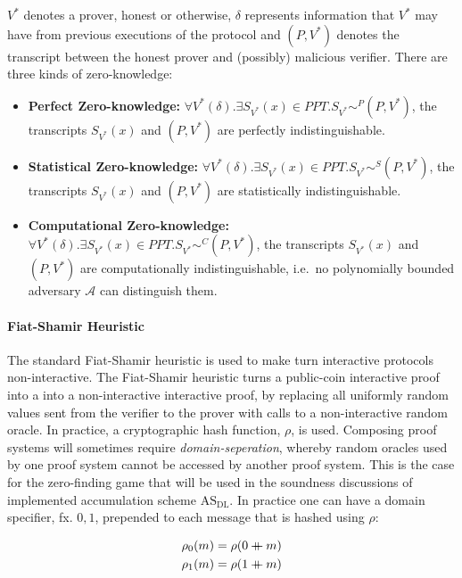 \documentclass[
]{article}
\providecommand{\tightlist}{%
  \setlength{\itemsep}{0pt}\setlength{\parskip}{0pt}}
\newcommand*\Ac{\mathcal{A}}
\renewcommand*\d{\delta}
\newcommand*\cat{\mathbin{+\mkern-10mu+}}
\newcommand*{\ASDL}{\text{AS}_{\text{DL}}}
\begin{document}
\(V^*\) denotes a prover, honest or otherwise, \(\d\) represents
information that \(V^*\) may have from previous executions of the
protocol and \((P,V^*)\) denotes the transcript between the honest
prover and (possibly) malicious verifier. There are three kinds of
zero-knowledge:

\begin{itemize}
\tightlist
\item
  \textbf{Perfect Zero-knowledge:}
  \(\forall V^*(\delta). \exists S_{V^*}(x) \in PPT. S_{V^*} \sim^P (P,V^*)\),
  the transcripts \(S_{V^*}(x)\) and \((P,V^*)\) are perfectly
  indistinguishable.
\item
  \textbf{Statistical Zero-knowledge:}
  \(\forall V^*(\delta). \exists S_{V^*}(x) \in PPT. S_{V^*} \sim^S (P,V^*)\),
  the transcripts \(S_{V^*}(x)\) and \((P,V^*)\) are statistically
  indistinguishable.
\item
  \textbf{Computational Zero-knowledge:}
  \(\forall V^*(\delta). \exists S_{V^*}(x) \in PPT. S_{V^*} \sim^C (P,V^*)\),
  the transcripts \(S_{V^*}(x)\) and \((P,V^*)\) are computationally
  indistinguishable, i.e.~no polynomially bounded adversary \(\Ac\) can
  distinguish them.
\end{itemize}

\paragraph{Fiat-Shamir Heuristic}\label{fiat-shamir-heuristic}

The standard Fiat-Shamir heuristic is used to make turn interactive
protocols non-interactive. The Fiat-Shamir heuristic turns a public-coin
interactive proof into a into a non-interactive interactive proof, by
replacing all uniformly random values sent from the verifier to the
prover with calls to a non-interactive random oracle. In practice, a
cryptographic hash function, \(\rho\), is used. Composing proof systems
will sometimes require \emph{domain-seperation}, whereby random oracles
used by one proof system cannot be accessed by another proof system.
This is the case for the zero-finding game that will be used in the
soundness discussions of implemented accumulation scheme \(\ASDL\). In
practice one can have a domain specifier, fx. \(0, 1\), prepended to
each message that is hashed using \(\rho\):

\[
\begin{aligned}
  \rho_0(m) &= \rho(0 \cat m) \\
  \rho_1(m) &= \rho(1 \cat m)
\end{aligned}
\]
\end{document}
